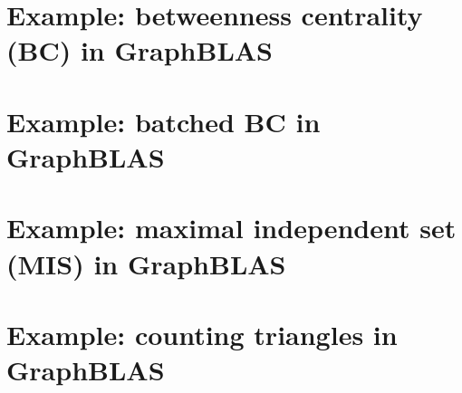 \pagebreak
\nolinenumbers
\section{Example: betweenness centrality (BC) in GraphBLAS}
\label{App:BCnobatch}
{\scriptsize

}
\vfill

\pagebreak
\nolinenumbers
\section{Example: batched BC in GraphBLAS}
{\scriptsize

}
\vfill

\pagebreak
\nolinenumbers
\section{Example: maximal independent set (MIS) in GraphBLAS}
{\scriptsize

}
\vfill

\pagebreak
\nolinenumbers
\section{Example: counting triangles in GraphBLAS}
{\scriptsize

}
\vfill
\pagebreak

\linenumbers
